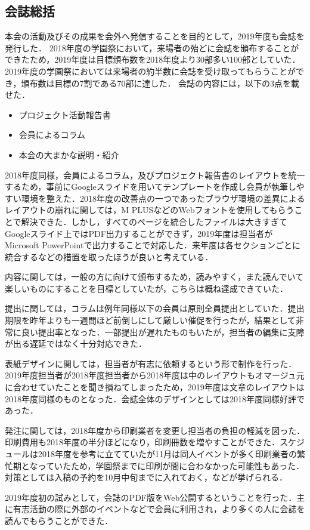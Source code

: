 \subsection*{会誌総括}


本会の活動及びその成果を会外へ発信することを目的として，2019年度も会誌を発行した．
2018年度の学園祭において，来場者の殆どに会誌を頒布することができたため，2019年度は目標頒布数を2018年度より30部多い100部としていた．
2019年度の学園祭においては来場者の約半数に会誌を受け取ってもらうことができ，頒布数は目標の7割である70部に達した．
会誌の内容には，以下の3点を載せた．
\begin{itemize}
  \item プロジェクト活動報告書
  \item 会員によるコラム
  \item 本会の大まかな説明・紹介
\end{itemize}

2018年度同様，会員によるコラム，及びプロジェクト報告書のレイアウトを統一するため，事前にGoogleスライドを用いてテンプレートを作成し会員が執筆しやすい環境を整えた．2018年度の改善点の一つであったブラウザ環境の差異によるレイアウトの崩れに関しては，M PLUSなどのWebフォントを使用してもらうことで解決できた．しかし，すべてのページを統合したファイルは大きすぎてGoogleスライド上ではPDF出力することができず，2019年度は担当者がMicrosoft PowerPointで出力することで対応した．来年度は各セクションごとに統合するなどの措置を取ったほうが良いと考えている．

内容に関しては，一般の方に向けて頒布するため，読みやすく，また読んでいて楽しいものにすることを目標としていたが，こちらは概ね達成できていた．

提出に関しては，コラムは例年同様\thirdgrade{}以下の会員は原則全員提出としていた．提出期限を昨年よりも一週間ほど前倒しにして厳しい催促を行ったが，結果として非常に良い提出率となった．一部提出が遅れたものもいたが，担当者の編集に支障が出る遅延ではなく十分対応できた．

表紙デザインに関しては，担当者が有志に依頼するという形で制作を行った．2019年度担当者が2018年度担当者から2018年度は中のレイアウトもオマージュ元に合わせていたことを聞き損ねてしまったため，2019年度は文章のレイアウトは2018年度同様のものとなった．会誌全体のデザインとしては2018年度同様好評であった．

発注に関しては，2018年度から印刷業者を変更し担当者の負担の軽減を図った．印刷費用も2018年度の半分ほどになり，印刷冊数を増やすことができた．スケジュールは2018年度を参考に立てていたが11月は同人イベントが多く印刷業者の繁忙期となっていたため，学園祭までに印刷が間に合わなかった可能性もあった．対策としては入稿の予約を10月中旬までに入れておく，などが挙げられる．

2019年度初の試みとして，会誌のPDF版をWeb公開するということを行った．主に有志活動の際に外部のイベントなどで会員に利用され，より多くの人に会誌を読んでもらうことができた．

